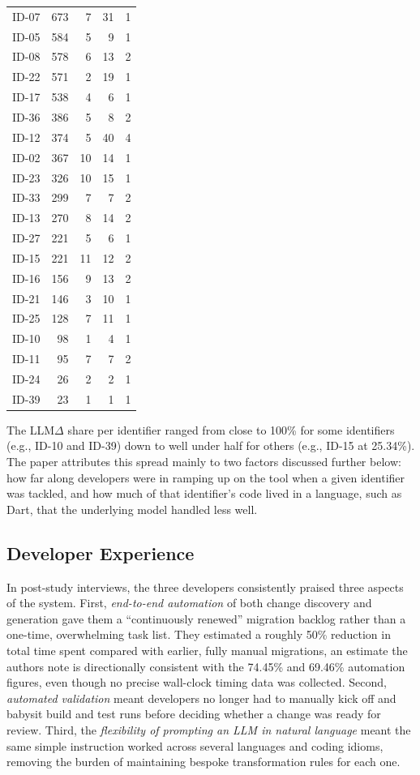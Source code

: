 \begin{table}[t]
\begin{tabular}{@{}lrrrr@{}}
ID-07 & 673 & 7 & 31 & 1 \\
ID-05 & 584 & 5 & 9 & 1 \\
ID-08 & 578 & 6 & 13 & 2 \\
ID-22 & 571 & 2 & 19 & 1 \\
ID-17 & 538 & 4 & 6 & 1 \\
ID-36 & 386 & 5 & 8 & 2 \\
ID-12 & 374 & 5 & 40 & 4 \\
ID-02 & 367 & 10 & 14 & 1 \\
ID-23 & 326 & 10 & 15 & 1 \\
ID-33 & 299 & 7 & 7 & 2 \\
ID-13 & 270 & 8 & 14 & 2 \\
ID-27 & 221 & 5 & 6 & 1 \\
ID-15 & 221 & 11 & 12 & 2 \\
ID-16 & 156 & 9 & 13 & 2 \\
ID-21 & 146 & 3 & 10 & 1 \\
ID-25 & 128 & 7 & 11 & 1 \\
ID-10 & 98 & 1 & 4 & 1 \\
ID-11 & 95 & 7 & 7 & 2 \\
ID-24 & 26 & 2 & 2 & 1 \\
ID-39 & 23 & 1 & 1 & 1 \\
\bottomrule
\end{tabular}
\end{table}


The LLM$\Delta$ share per identifier ranged from close to 100\% for
some identifiers (e.g., ID-10 and ID-39) down to well under half for
others (e.g., ID-15 at 25.34\%). The paper attributes this spread
mainly to two factors discussed further below: how far along
developers were in ramping up on the tool when a given identifier was
tackled, and how much of that identifier's code lived in a language,
such as Dart, that the underlying model handled less well.

\subsection{Developer Experience}
In post-study interviews, the three developers consistently praised
three aspects of the system. First, \emph{end-to-end automation} of
both change discovery and generation gave them a ``continuously
renewed'' migration backlog rather than a one-time, overwhelming task
list. They estimated a roughly 50\% reduction in total time spent
compared with earlier, fully manual migrations, an estimate the
authors note is directionally consistent with the 74.45\% and 69.46\%
automation figures, even though no precise wall-clock timing data was
collected. Second, \emph{automated validation} meant developers no
longer had to manually kick off and babysit build and test runs
before deciding whether a change was ready for review. Third, the
\emph{flexibility of prompting an LLM in natural language} meant the
same simple instruction worked across several languages and coding
idioms, removing the burden of maintaining bespoke transformation
rules for each one.

